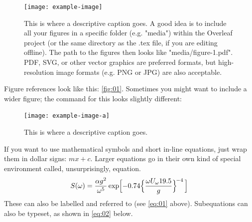 \documentclass[draft, {\secondLanguage}, english]{volcanica-template}
\begin{document}
\begin{figure}[!b]								%
\centering
\texttt{[image: example-image]} %
\caption{This is where a descriptive caption goes. A good idea is to include all your figures in a specific folder (e.g. "media") within the Overleaf project (or the same directory as the .tex file, if you are editing offline). The path to the figures then looks like "media/figure-1.pdf". PDF, SVG, or other vector graphics are preferred formats, but high-resolution image formats (e.g. PNG or JPG) are also acceptable.}		%
\label{fig:011}			%
\end{figure}

Figure references look like this: \autoref{fig:01}. Sometimes you might want to include a wider figure; the command for this looks slightly different:
\begin{figure}[!t]								%
\centering
\texttt{[image: example-image-a]} %
\caption{This is where a descriptive caption goes.}	%
\label{fig:022}									%
\end{figure}

If you want to use mathematical symbols and short in-line equations, just wrap them in dollar signs: $mx +c$. Larger equations go in their own kind of special environment called, unsurprisingly, equation.
\begin{equation}
S(\omega) = \frac{\alpha g^2}{\omega^5} \exp\Bigl[ -0.74\Bigl\{\frac{\omega U_\omega 19.5}{g}\Bigr\}^{\!-4}\,\Bigr] 
\label{eq:01}\end{equation}
These can also be labelled and referred to (see \autoref{eq:01} above). Subequations can also be typeset, as shown in \autoref{eq:02} below.
\end{document}
